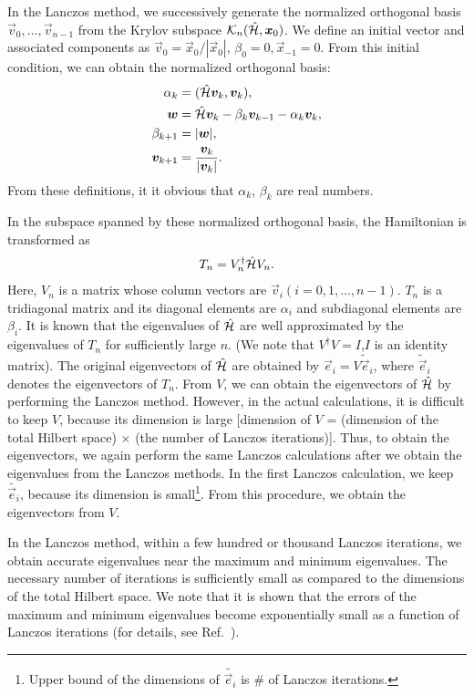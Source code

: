 In the Lanczos method,
we successively generate the normalized orthogonal basis 
${\vec{v}_{0},\dots,\vec{v}_{n-1}}$ from the Krylov subspace $\mathcal{K}_{n}(\hat{\mathcal{H}},\boldsymbol x_{0})$.
We define an initial vector and associated components as 
$\vec{v}_{0} =\vec{x}_{0}/|\vec{x}_{0}|$,
$\beta_{0}=0,\vec{x}_{-1}=0$.
From this initial condition,
we can obtain the normalized orthogonal basis:
\begin{align}
\alpha_{k} &= (\hat{\mathcal{H}}\boldsymbol v_{k},\boldsymbol v_{k}), \\
\boldsymbol w   &= \hat{\mathcal{H}}\boldsymbol v_{k}-\beta_{k}\boldsymbol v_{k-1}-\alpha_{k}\boldsymbol v_{k}, \\
\beta_{k+1} &= |\boldsymbol w|, \\
\boldsymbol v_{k+1} &= \frac{\boldsymbol v_{k}}{|\boldsymbol v_{k}|}. \label{eq: LanczosVector}
\end{align}
From these definitions, it it obvious that $\alpha_{k}$, $\beta_{k}$ are real numbers.

In the subspace spanned by these normalized orthogonal basis,
the Hamiltonian is transformed as
\begin{align}
T_{n}=V_{n}^{\dagger}\hat{\mathcal{H}} V_{n}.
\end{align}
Here,
$V_{n}$ is a matrix whose column vectors are $\vec{v}_{i}(i=0,1,\dots,n-1)$.
$T_{n}$ is a tridiagonal matrix and its diagonal elements
are $\alpha_{i}$ and
subdiagonal elements are $\beta_{i}$.
It is known that
the eigenvalues of $\hat{\mathcal{H}}$ are well approximated by 
the eigenvalues of $T_{n}$ for sufficiently large $n$.
(We note that $V^{\dagger}V=I$,$I$ is an identity matrix).
The original eigenvectors of $\hat{\mathcal{H}}$ are obtained 
by $\vec{e}_{i}=V\tilde{\vec{e}}_{i}$,
where  $\tilde{\vec{e}}_{i}$ denotes
the eigenvectors of $T_{n}$.
From $V$, 
we can obtain the eigenvectors of $\hat{\mathcal{H}}$
by performing the Lanczos method.
However, in the actual calculations,
it is difficult to keep $V$, because its dimension
is large [dimension of $V$ = (dimension of the total Hilbert space) $\times$ (the number of Lanczos iterations)].
Thus, to obtain the eigenvectors, 
we again perform the same Lanczos calculations
after we obtain the eigenvalues from the Lanczos methods.
In the first Lanczos calculation, we keep $\tilde{\vec{e}_{i}}$, 
because its dimension is small\footnote{Upper bound of the dimensions of $\tilde{\vec{e}_{i}}$ 
is $\#$ of Lanczos iterations.}.
From this procedure, we obtain the eigenvectors  from $V$.

In the Lanczos method,
within a few hundred or thousand Lanczos iterations,
we obtain accurate eigenvalues near the maximum and minimum eigenvalues.
The necessary number of iterations is sufficiently small as 
compared to the dimensions
of the total Hilbert space.
We note that it is shown that
the errors of the maximum and minimum eigenvalues
become exponentially small as a function of Lanczos iterations 
(for details, see Ref.~\cite{SugiharaMurota_en}).

